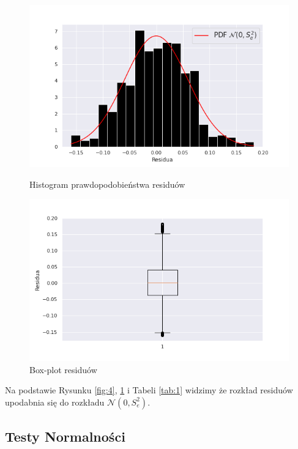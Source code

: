 \documentclass[fleqn]{article}
\begin{document}
    \begin{figure}[H]
        \begin{minipage}{0.5\textwidth}
            \includegraphics[width=1.1\textwidth]{fig4.png}
            \caption{Histogram prawdopodobieństwa residuów}
            \label{fig:4}
        \end{minipage}\hfill
        \begin{minipage}{0.5\textwidth}
            \includegraphics[width=1.1\textwidth]{fig5.png}\hfill
            \caption{Box-plot residuów}
            \label{fig:5}
        \end{minipage}\hfill
    \end{figure}

    \noindent Na podstawie Rysunku \ref{fig:4}, \ref{fig:5} i  Tabeli \ref{tab:1} widzimy 
    że rozkład residuów upodabnia się do rozkładu $\mathcal{N}(0,S^2_e)$.

    \newpage

    \subsection{Testy Normalności}
\end{document}
